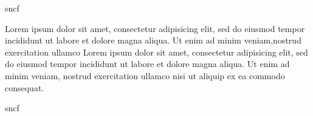 \documentclass{book}
\begin{document}
\makeatletter


\begin{pages}


\begin{Leftside}
\beginnumbering

\pstart
sncf\skipnumbering
\pend
\pstart
\begin{ledgroup}
{

Lorem ipsum dolor sit amet, consectetur adipisicing elit, sed do eiusmod tempor incididunt ut labore et dolore magna aliqua. Ut enim ad minim veniam,nostrud exercitation ullamco  
Lorem ipsum dolor sit amet, consectetur adipisicing elit, sed do eiusmod tempor incididunt ut labore et dolore magna aliqua. Ut enim ad minim veniam, nostrud exercitation ullamco  nisi ut aliquip ex ea commodo consequat.}
\end{ledgroup}
\pend

\pstart
sncf\skipnumbering
\pend
\pstart
\begin{ledgroup}


\end{ledgroup}
\end{Leftside}
\end{pages}
\end{document}
